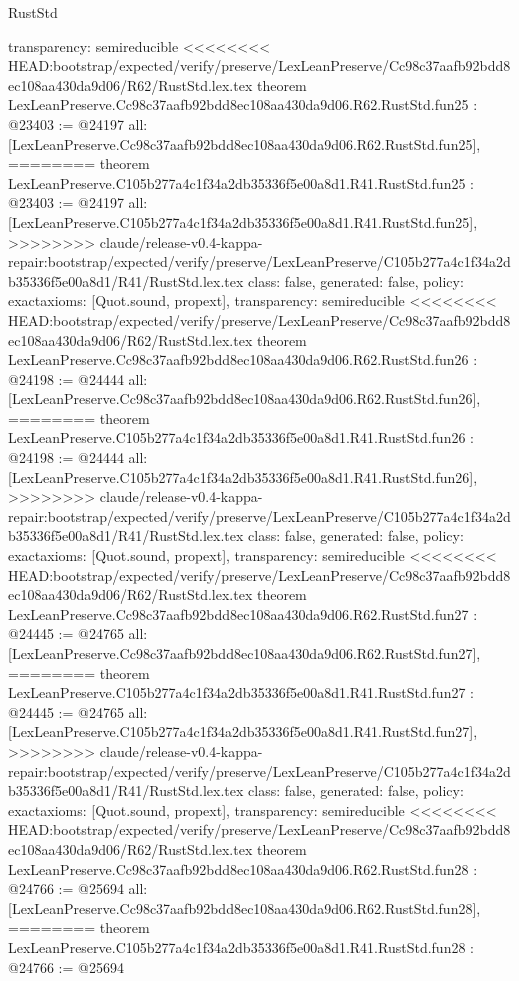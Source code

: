 \begin{lexlean}{RustStd}
\begin{coremodule}
{\begin{coremodule}
{{{{{{{{{{{{{{{{{{{{{{{{{{{{  transparency: semireducible
}
<<<<<<<< HEAD:bootstrap/expected/verify/preserve/LexLeanPreserve/Cc98c37aafb92bdd8ec108aa430da9d06/R62/RustStd.lex.tex
theorem LexLeanPreserve.Cc98c37aafb92bdd8ec108aa430da9d06.R62.RustStd.fun25 : @23403 := @24197 {
  all: [LexLeanPreserve.Cc98c37aafb92bdd8ec108aa430da9d06.R62.RustStd.fun25],
========
theorem LexLeanPreserve.C105b277a4c1f34a2db35336f5e00a8d1.R41.RustStd.fun25 : @23403 := @24197 {
  all: [LexLeanPreserve.C105b277a4c1f34a2db35336f5e00a8d1.R41.RustStd.fun25],
>>>>>>>> claude/release-v0.4-kappa-repair:bootstrap/expected/verify/preserve/LexLeanPreserve/C105b277a4c1f34a2db35336f5e00a8d1/R41/RustStd.lex.tex
  class: false,
  generated: false,
  policy: exact{axioms: [Quot.sound, propext]},
  transparency: semireducible
}
<<<<<<<< HEAD:bootstrap/expected/verify/preserve/LexLeanPreserve/Cc98c37aafb92bdd8ec108aa430da9d06/R62/RustStd.lex.tex
theorem LexLeanPreserve.Cc98c37aafb92bdd8ec108aa430da9d06.R62.RustStd.fun26 : @24198 := @24444 {
  all: [LexLeanPreserve.Cc98c37aafb92bdd8ec108aa430da9d06.R62.RustStd.fun26],
========
theorem LexLeanPreserve.C105b277a4c1f34a2db35336f5e00a8d1.R41.RustStd.fun26 : @24198 := @24444 {
  all: [LexLeanPreserve.C105b277a4c1f34a2db35336f5e00a8d1.R41.RustStd.fun26],
>>>>>>>> claude/release-v0.4-kappa-repair:bootstrap/expected/verify/preserve/LexLeanPreserve/C105b277a4c1f34a2db35336f5e00a8d1/R41/RustStd.lex.tex
  class: false,
  generated: false,
  policy: exact{axioms: [Quot.sound, propext]},
  transparency: semireducible
}
<<<<<<<< HEAD:bootstrap/expected/verify/preserve/LexLeanPreserve/Cc98c37aafb92bdd8ec108aa430da9d06/R62/RustStd.lex.tex
theorem LexLeanPreserve.Cc98c37aafb92bdd8ec108aa430da9d06.R62.RustStd.fun27 : @24445 := @24765 {
  all: [LexLeanPreserve.Cc98c37aafb92bdd8ec108aa430da9d06.R62.RustStd.fun27],
========
theorem LexLeanPreserve.C105b277a4c1f34a2db35336f5e00a8d1.R41.RustStd.fun27 : @24445 := @24765 {
  all: [LexLeanPreserve.C105b277a4c1f34a2db35336f5e00a8d1.R41.RustStd.fun27],
>>>>>>>> claude/release-v0.4-kappa-repair:bootstrap/expected/verify/preserve/LexLeanPreserve/C105b277a4c1f34a2db35336f5e00a8d1/R41/RustStd.lex.tex
  class: false,
  generated: false,
  policy: exact{axioms: [Quot.sound, propext]},
  transparency: semireducible
}
<<<<<<<< HEAD:bootstrap/expected/verify/preserve/LexLeanPreserve/Cc98c37aafb92bdd8ec108aa430da9d06/R62/RustStd.lex.tex
theorem LexLeanPreserve.Cc98c37aafb92bdd8ec108aa430da9d06.R62.RustStd.fun28 : @24766 := @25694 {
  all: [LexLeanPreserve.Cc98c37aafb92bdd8ec108aa430da9d06.R62.RustStd.fun28],
========
theorem LexLeanPreserve.C105b277a4c1f34a2db35336f5e00a8d1.R41.RustStd.fun28 : @24766 := @25694 {
}}}}}}}}}}}}}}}}}}}}}}}}}}}}}}}}
\end{coremodule}}
\end{coremodule}
\end{lexlean}

